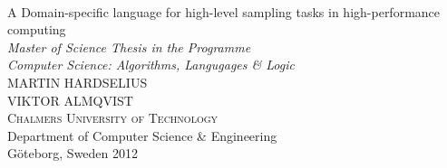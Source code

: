 \begin{titlepage}

\mbox{}
\vfill
\addtolength{\voffset}{2cm}
\begin{flushleft}
  {\\[0.2cm]
    {\huge A Domain-specific language for high-level sampling
      tasks in high-performance computing}\\[.5cm]
    \emph{\Large Master of Science Thesis in the Programme\\Computer
      Science: Algorithms, Langugages \& Logic}\\[.8cm]
      
	
    {\huge MARTIN HARDSELIUS}\\[.8cm]
    {\huge VIKTOR ALMQVIST}\\[.8cm]
	
    {\Large \textsc{Chalmers University of Technology}\\
      \Large Department of Computer Science \& Engineering \\
	Göteborg, Sweden 2012 \\
    } 
  }
\end{flushleft}

\end{titlepage}
\ClearShipoutPicture
